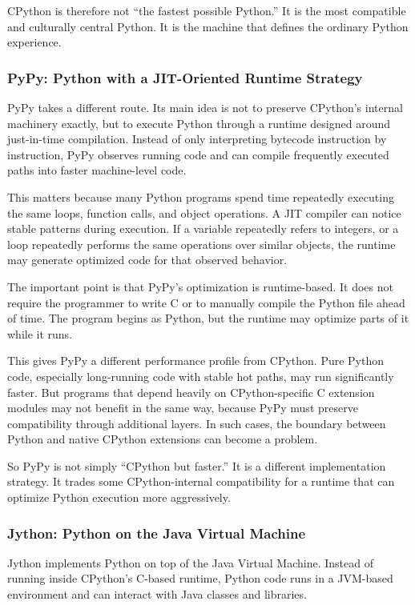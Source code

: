 CPython is therefore not ``the fastest possible Python.'' It is the most compatible and culturally central Python. It is the machine that defines the ordinary Python experience.

\subsubsection{PyPy: Python with a JIT-Oriented Runtime Strategy}

PyPy takes a different route. Its main idea is not to preserve CPython's internal machinery exactly, but to execute Python through a runtime designed around just-in-time compilation. Instead of only interpreting bytecode instruction by instruction, PyPy observes running code and can compile frequently executed paths into faster machine-level code.

This matters because many Python programs spend time repeatedly executing the same loops, function calls, and object operations. A JIT compiler can notice stable patterns during execution. If a variable repeatedly refers to integers, or a loop repeatedly performs the same operations over similar objects, the runtime may generate optimized code for that observed behavior.

The important point is that PyPy's optimization is runtime-based. It does not require the programmer to write C or to manually compile the Python file ahead of time. The program begins as Python, but the runtime may optimize parts of it while it runs.

This gives PyPy a different performance profile from CPython. Pure Python code, especially long-running code with stable hot paths, may run significantly faster. But programs that depend heavily on CPython-specific C extension modules may not benefit in the same way, because PyPy must preserve compatibility through additional layers. In such cases, the boundary between Python and native CPython extensions can become a problem.

So PyPy is not simply ``CPython but faster.'' It is a different implementation strategy. It trades some CPython-internal compatibility for a runtime that can optimize Python execution more aggressively.

\subsubsection{Jython: Python on the Java Virtual Machine}

Jython implements Python on top of the Java Virtual Machine. Instead of running inside CPython's C-based runtime, Python code runs in a JVM-based environment and can interact with Java classes and libraries.

